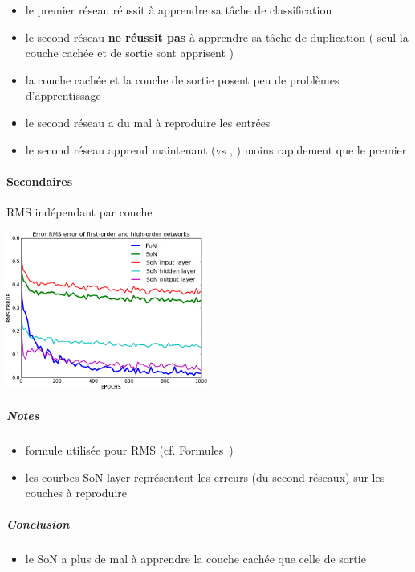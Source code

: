 	\begin{itemize}
	  \item le premier réseau réussit à apprendre sa tâche de classification
	  \item le second réseau \textbf{ne réussit pas} à apprendre sa tâche de duplication ( seul la couche cachée et de sortie sont apprisent )
	  \item la couche cachée et la couche de sortie posent peu de problèmes d'apprentissage
	  \item le second réseau a du mal à reproduire les entrées
	  \item le second réseau apprend maintenant (vs , ) moins rapidement que le premier
	\end{itemize}
	
    \paragraph{Secondaires}
      RMS indépendant par couche
      \begin{center}
	\includegraphics[width=250px]{data/expA3/rms_new.png}
      \end{center}
      \subparagraph{Notes}
	\begin{itemize}
	  \item formule utilisée pour RMS (cf. Formules~)
	  \item les courbes SoN layer représentent les erreurs (du second réseaux) sur les couches à reproduire
	\end{itemize}
      \subparagraph{Conclusion}
	\begin{itemize}
	  \item le SoN a plus de mal à apprendre la couche cachée que celle de sortie
	\end{itemize}
	
	
